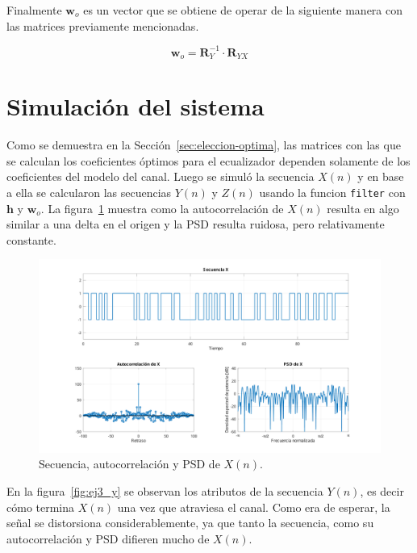 Finalmente $\mathbf{w}_o$ es un vector que se obtiene de operar de la siguiente manera con las matrices previamente mencionadas.

\begin{equation}
	\mathbf{w}_o = \mathbf{R}_Y^{-1} \cdot \mathbf{R}_{YX}
\end{equation}

\section{Simulación del sistema}

Como se demuestra en la Sección~\ref{sec:eleccion-optima}, las matrices con las que se calculan los coeficientes óptimos para el ecualizador dependen solamente de los coeficientes del modelo del canal. Luego se simuló la secuencia $X(n)$ y en base a ella se calcularon las secuencias $Y(n)$ y $Z(n)$ usando la funcion \verb*|filter| con $\mathbf{h}$ y $\mathbf{w}_o$. La figura~\ref{fig:ej3_x} muestra como la autocorrelación de $X(n)$ resulta en algo similar a una delta en el origen y la PSD resulta ruidosa, pero relativamente constante.

\begin{figure}[!hbp]
	\centering
    \includegraphics[width=1\linewidth,trim=4cm 0 4cm 0,clip]{img/ej3_x.pdf}
	\caption{Secuencia, autocorrelación y PSD de $X(n)$.}
	\label{fig:ej3_x}
\end{figure}

En la figura~\ref{fig:ej3_y} se observan los atributos de la secuencia $Y(n)$, es decir cómo termina $X(n)$ una vez que atraviesa el canal. Como era de esperar, la señal se distorsiona considerablemente, ya que tanto la secuencia, como su autocorrelación y PSD difieren mucho de $X(n)$.

